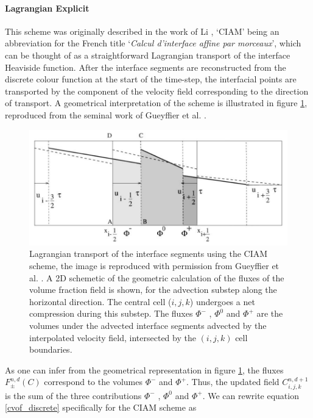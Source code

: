 \paragraph{Lagrangian Explicit} 
This scheme was originally described in the work of Li \cite{li95}, `CIAM' being an 
abbreviation for the French title `\textit{Calcul d'interface affine par morceaux}', 
which can be thought of as a straightforward Lagrangian transport of the interface Heaviside function. 
After the interface segments are reconstructed from the discrete colour function 
at the start of the time-step, the interfacial points are transported by the component of the 
velocity field corresponding to the direction of transport. A geometrical interpretation of the scheme
is illustrated in figure \ref{fig:ciam}, reproduced from the seminal work of Gueyffier et al. \cite{gueyffier}. 

\begin{figure}[!h]
\includegraphics[width=1.0\textwidth]{plots/methodology/ciam.png} 
\caption{
Lagrangian transport of the interface segments using the CIAM scheme, the image
is reproduced with permission from Gueyffier et al. \cite{gueyffier}. 
A 2D schemetic of the geometric calculation of the fluxes of the volume 
fraction field is shown, for the advection substep along the horizontal direction.
The central cell ($i,j,k$) undergoes a net compression during this substep.
The fluxes $\Phi^{-}$ , $\Phi^{0}$ and $\Phi^{+}$ are the volumes under the 
advected interface segments advected by the interpolated velocity field,
intersected by the $(i,j,k)$ cell boundaries.
}
\label{fig:ciam}
\end{figure}

As one can infer from the geometrical representation in figure \ref{fig:ciam}, 
the fluxes $F_{\pm}^{n,d}(C)$ correspond to the volumes $\Phi^{-}$ and $\Phi^{+}$. 
Thus, the updated field $C_{i,j,k}^{n,d+1}$ is the sum of the 
three contributions $\Phi^{-}$ , $\Phi^{0}$ and $\Phi^{+}$. 
We can rewrite equation \ref{cvof_discrete} specifically for the CIAM scheme as   

